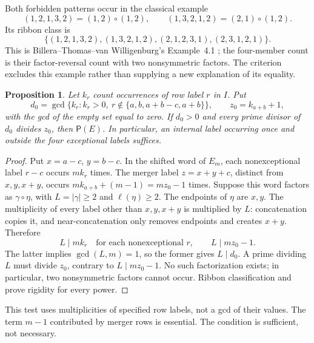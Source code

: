 \documentclass[11pt,a4paper]{amsart}
\numberwithin{equation}{section}
\theoremstyle{plain}
\newtheorem{proposition}[theorem]{Proposition}
\theoremstyle{definition}
\begin{document}
Both forbidden patterns occur in the classical example
\[
 (1,2,1,3,2)=(1,2)\circ(1,2),\qquad
 (1,3,2,1,2)=(2,1)\circ(1,2).
\]
Its ribbon class is
\[
 \{(1,2,1,3,2),(1,3,2,1,2),(2,1,2,3,1),(2,3,1,2,1)\}.
\]
This is Billera--Thomas--van Willigenburg's Example~4.1 \cite{Billera2006DecomposableCompositions}; the four-member count is their factor-reversal count with two nonsymmetric factors.  The criterion excludes this example rather than supplying a new explanation of its equality.

\begin{proposition}\label{prop:multiplicity-recognition}
Let \(k_r\) count occurrences of row label \(r\) in \(I\).  Put
\[
 d_0=\gcd\{k_r:k_r>0,\ r\notin\{a,b,a+b-c,a+b\}\},\qquad
 z_0=k_{a+b}+1,
\]
with the gcd of the empty set equal to zero.  If \(d_0>0\) and every prime divisor of \(d_0\) divides \(z_0\), then \(\mathsf P(E)\).  In particular, an internal label occurring once and outside the four exceptional labels suffices.
\end{proposition}
\begin{proof}
Put \(x=a-c\), \(y=b-c\).  In the shifted word of \(E_m\), each nonexceptional label \(r-c\) occurs \(mk_r\) times.  The merger label \(z=x+y+c\), distinct from \(x,y,x+y\), occurs \(mk_{a+b}+(m-1)=mz_0-1\) times.  Suppose this word factors as \(\gamma\circ\eta\), with \(L=|\gamma|\ge2\) and \(\ell(\eta)\ge2\).  The endpoints of \(\eta\) are \(x,y\).  The multiplicity of every label other than \(x,y,x+y\) is multiplied by \(L\): concatenation copies it, and near-concatenation only removes endpoints and creates \(x+y\).  Therefore
\[
 L\mid mk_r\quad\text{for each nonexceptional }r,
 \qquad L\mid mz_0-1.
\]
The latter implies \(\gcd(L,m)=1\), so the former gives \(L\mid d_0\).  A prime dividing \(L\) must divide \(z_0\), contrary to \(L\mid mz_0-1\).  No such factorization exists; in particular, two nonsymmetric factors cannot occur.  Ribbon classification and  prove rigidity for every power.
\end{proof}

This test uses multiplicities of specified row labels, not a gcd of their values.  The term \(m-1\) contributed by merger rows is essential.  The condition is sufficient, not necessary.
\end{document}
